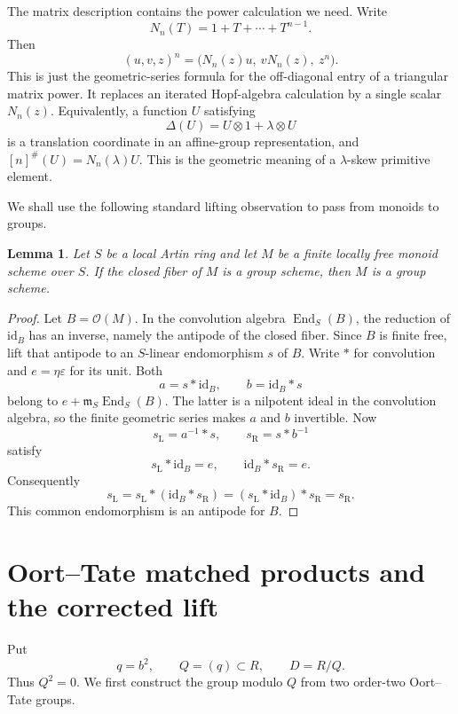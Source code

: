\documentclass[11pt]{amsart}
\newtheorem{lemma}[theorem]{Lemma}
\theoremstyle{remark}
\newcommand{\eps}{\varepsilon}
\newcommand{\ot}{\otimes}
\begin{document}
The matrix description contains the power calculation we need.  Write
\[
 N_n(T)=1+T+\cdots+T^{n-1}.
\]
Then
\begin{equation}\label{eq:H-power}
 (u,v,z)^n=\bigl(N_n(z)u,\ vN_n(z),\ z^n\bigr).
\end{equation}
This is just the geometric-series formula for the off-diagonal entry of
a triangular matrix power.  It replaces an iterated Hopf-algebra
calculation by a single scalar \(N_n(z)\).
Equivalently, a function \(U\) satisfying
\[
 \Delta(U)=U\ot1+\lambda\ot U
\]
is a translation coordinate in an affine-group representation, and
\([n]^\#(U)=N_n(\lambda)U\).  This is the geometric meaning of a
\(\lambda\)-skew primitive element.

We shall use the following standard lifting observation to pass from
monoids to groups.

\begin{lemma}\label{lem:monoid-to-group}
Let \(S\) be a local Artin ring and let \(M\) be a finite locally free
monoid scheme over \(S\).  If the closed fiber of \(M\) is a group
scheme, then \(M\) is a group scheme.
\end{lemma}

\begin{proof}
Let \(B=\mathcal O(M)\).  In the convolution algebra
\(\operatorname{End}_S(B)\), the reduction of
\(\mathrm{id}_B\) has an inverse, namely the antipode of the closed
fiber.  Since \(B\) is finite free, lift that antipode to an
\(S\)-linear endomorphism \(s\) of \(B\).  Write \(*\) for convolution
and \(e=\eta\eps\) for its unit.  Both
\[
 a=s*\mathrm{id}_B,\qquad b=\mathrm{id}_B*s
\]
belong to \(e+\mathfrak m_S\operatorname{End}_S(B)\).  The latter is a
nilpotent ideal in the convolution algebra, so the finite geometric
series makes \(a\) and \(b\) invertible.  Now
\[
 s_{\mathrm L}=a^{-1}*s,\qquad
 s_{\mathrm R}=s*b^{-1}
\]
satisfy
\[
 s_{\mathrm L}*\mathrm{id}_B=e,\qquad
 \mathrm{id}_B*s_{\mathrm R}=e.
\]
Consequently
\[
 s_{\mathrm L}
 =s_{\mathrm L}*(\mathrm{id}_B*s_{\mathrm R})
 =(s_{\mathrm L}*\mathrm{id}_B)*s_{\mathrm R}
 =s_{\mathrm R}.
\]
This common endomorphism is an antipode for \(B\).
\end{proof}

\section{Oort--Tate matched products and the corrected lift}
\label{sec:construction}

Put
\[
 q=b^2,\qquad Q=(q)\subset R,\qquad D=R/Q.
\]
Thus \(Q^2=0\).  We first construct the group modulo \(Q\) from two
order-two Oort--Tate groups.
\end{document}
